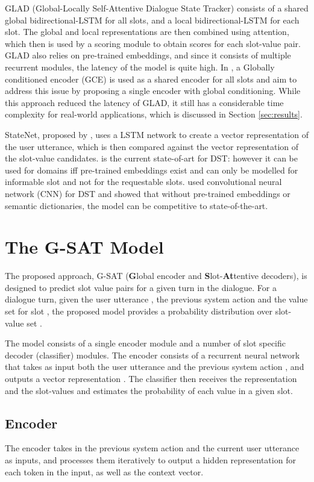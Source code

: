 \documentclass{article}
\begin{document}
GLAD (Global-Locally Self-Attentive Dialogue State Tracker) \cite{GLAD} consists of a shared global bidirectional-LSTM \cite{hochreiter1997long} for all slots, and a local bidirectional-LSTM for each slot.
The global and local representations are then combined using attention, which then is used by a scoring module to obtain scores for each slot-value pair.
GLAD also relies on pre-trained embeddings, and since it consists of multiple recurrent modules, the latency of the model is quite high.
In \cite{GCE}, a Globally conditioned encoder (GCE) is used as a shared encoder for all slots and aim to address this issue by proposing a single encoder with global conditioning.
While this approach reduced the latency of GLAD, it still has a considerable time complexity for real-world applications, which is discussed in Section \ref{sec:results}.

StateNet, proposed by \cite{Ren2018}, uses a LSTM network to create a vector representation of the user utterance, which is then compared against the vector representation of the slot-value candidates.
\cite{Ren2018} is the current state-of-art for DST: however it can be used for domains iff pre-trained embeddings exist and can only be modelled for informable slot and not for the requestable slots.
\cite{Mandy2018} used convolutional neural network (CNN) for DST and showed that without pre-trained embeddings or semantic dictionaries, the model can be competitive to state-of-the-art.

\section{The G-SAT Model}
\label{sec:model}
The proposed approach, G-SAT (\textbf{G}lobal encoder and \textbf{S}lot-\textbf{At}tentive decoders), is designed to predict slot value pairs for a given turn in the dialogue.
For a dialogue turn, given the user utterance , the previous system action  and the value set  for slot , the proposed model provides a probability distribution over slot-value set .


The model consists of a single encoder module and a number of slot specific decoder (classifier) modules.
The encoder consists of a recurrent neural network that takes as input both the user utterance  and the previous system action , and outputs a vector representation .
The classifier then receives the representation  and the slot-values  and estimates the probability of each value in a given slot.

\subsection{Encoder}
The encoder takes in the previous system action  and the current user utterance  as inputs, and processes them iteratively to output a hidden representation for each token in the input, as well as the context vector.
\end{document}
